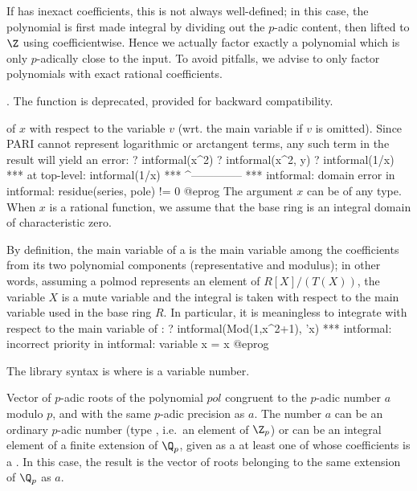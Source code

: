 If  has inexact  coefficients, this is not always
well-defined; in this case, the polynomial is first made integral by dividing
out the $p$-adic content,  then lifted to $\Z$ using 
coefficientwise.
Hence we actually factor exactly a polynomial which is only $p$-adically
close to the input. To avoid pitfalls, we advise to only factor polynomials
with exact rational coefficients.

 . The function  is
deprecated, provided for backward compatibility.

\label{se:intformal}
 of $x$ with respect to the variable $v$ (wrt.
the main variable if $v$ is omitted). Since PARI cannot represent
logarithmic or arctangent terms, any such term in the result will yield an
error:
\bprog
 ? intformal(x^2)
 ? intformal(x^2, y)
 ? intformal(1/x)
   ***   at top-level: intformal(1/x)
   ***                 ^--------------
   *** intformal: domain error in intformal: residue(series, pole) != 0
@eprog
The argument $x$ can be of any type. When $x$ is a rational function, we
assume that the base ring is an integral domain of characteristic zero.

  By  definition,   the main variable of a  is the main variable
among the  coefficients  from  its  two  polynomial  components
(representative and modulus); in other words, assuming a polmod represents an
element of $R[X]/(T(X))$, the variable $X$ is a mute variable and the
integral is taken with respect to the main variable used in the base ring $R$.
In particular, it is meaningless to integrate with respect to the main
variable of :
\bprog
? intformal(Mod(1,x^2+1), 'x)
*** intformal: incorrect priority in intformal: variable x = x
@eprog

The library syntax is  where  is a variable number.

\label{se:padicappr}
Vector of $p$-adic roots of the
polynomial $pol$ congruent to the $p$-adic number $a$ modulo $p$, and with
the same $p$-adic precision as $a$. The number $a$ can be an ordinary
$p$-adic number (type , i.e.~an element of $\Z_p$) or can be an
integral element of a finite extension of $\Q_p$, given as a 
at least one of whose coefficients is a . In this case, the result
is the vector of roots belonging to the same extension of $\Q_p$ as $a$.

